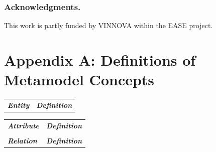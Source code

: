 \documentclass[a4paper]{llncs}
\begin{document}


\subsubsection*{Acknowledgments.} This work is partly funded by  VINNOVA within the EASE project.




\clearpage
\section*{Appendix A: Definitions of Metamodel Concepts}
\begin{minipage}{1\linewidth}
\begin{minipage}{0.30\textwidth} 

\begin{table}[H]
\vspace{-1.0cm}
\fontsize{6}{6.5}\selectfont

\begin{tabular}{l p{4.6cm}}

\textbf{\textit{Entity}} & \textbf{\textit{Definition}}  \\

 \end{tabular}
\end{table}
\end{minipage}
 \hspace{4em plus 1fill} 
\begin{minipage}{0.46\textwidth} 
 \begin{table}[H]
\fontsize{6}{6.5}\selectfont
\vspace{-1.0cm}
\label{table-entities}
\begin{tabular}{|l p{4.1cm}}
 
\textbf{\textit{Attribute}} & \textbf{\textit{Definition}}  \\ 

 & \\
 \textbf{\textit{Relation}} & \textbf{\textit{Definition}}  \\ 


\end{tabular}
\end{table}

\end{minipage}
\end{minipage}
\end{document}
